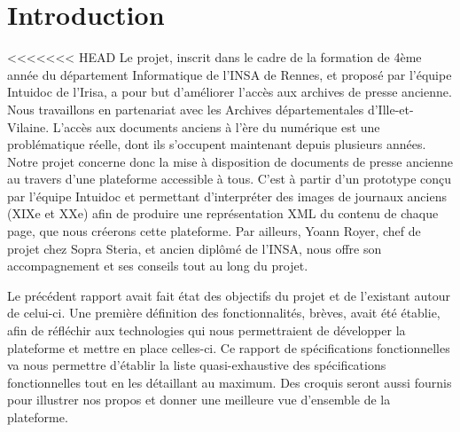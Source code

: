 \section{Introduction}
\label{sec:intro}

<<<<<<< HEAD
Le projet, inscrit dans le cadre de la formation de 4ème année du département Informatique de l’INSA de Rennes, et proposé par l’équipe
Intuidoc de l’Irisa, a pour but d’améliorer l’accès aux archives de presse ancienne. Nous travaillons en partenariat avec les Archives départementales d’Ille-et-Vilaine. L'accès aux documents anciens à l'ère du numérique est une problématique réelle, dont ils s'occupent maintenant depuis plusieurs années. Notre projet concerne donc la mise à disposition de documents de presse ancienne au travers d'une plateforme accessible à tous. C'est à partir d'un prototype conçu par l'équipe Intuidoc et permettant d'interpréter des images de journaux anciens (XIXe et XXe) afin de produire une représentation XML du contenu de chaque page, que nous créerons cette plateforme. Par ailleurs, Yoann Royer, chef de projet chez Sopra Steria, et ancien diplômé de l'INSA, nous offre son accompagnement et ses conseils tout au long du projet.

Le précédent rapport avait fait état des objectifs du projet et de l'existant autour de celui-ci. Une première définition des fonctionnalités, brèves, avait été établie, afin de réfléchir aux technologies qui nous permettraient de développer la plateforme et mettre en place celles-ci. Ce rapport de spécifications fonctionnelles va nous permettre d'établir la liste quasi-exhaustive des spécifications fonctionnelles tout en les détaillant au maximum. Des croquis seront aussi fournis pour illustrer nos propos et donner une meilleure vue d'ensemble de la plateforme.

